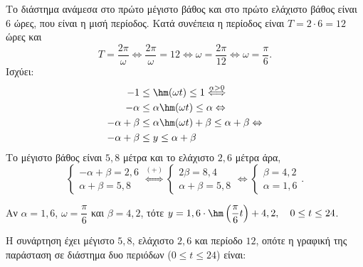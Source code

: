 \begin{alist}
\item Το διάστημα ανάμεσα στο πρώτο μέγιστο βάθος και στο πρώτο ελάχιστο βάθος είναι $6$ ώρες, που είναι η μισή περίοδος. Κατά συνέπεια η περίοδος είναι $T = 2 \cdot 6 = 12$ ώρες και
\[T = \frac{2\pi}{\omega} \Leftrightarrow \frac{2\pi}{\omega} = 12 \Leftrightarrow \omega = \frac{2\pi}{12} \Leftrightarrow \omega = \frac{\pi}{6}.\]
Ισχύει:
\begin{align*}
-1 &\le \hm (\omega t) \le 1 \overset{\alpha > 0}{\Longleftrightarrow} \\
-\alpha &\le \alpha\hm (\omega t) \le \alpha \Leftrightarrow \\
-\alpha + \beta &\le \alpha\hm (\omega t) + \beta \le \alpha + \beta \Leftrightarrow \\
-\alpha + \beta &\le y \le \alpha + \beta
\end{align*}
Το μέγιστο βάθος είναι $5,8$ μέτρα και το ελάχιστο $2,6$ μέτρα άρα,
\[\begin{cases} -\alpha + \beta = 2,6 \\ \alpha + \beta = 5,8 \end{cases} \overset{(+)}{\Longleftrightarrow} \begin{cases} 2\beta = 8,4 \\ \alpha + \beta = 5,8 \end{cases} \Leftrightarrow \begin{cases} \beta = 4,2 \\ \alpha = 1,6 \end{cases}.\]
\item Αν $\alpha = 1,6$, $\omega = \dfrac{\pi}{6}$ και $\beta = 4,2$, τότε $y = 1,6 \cdot \hm \left(\dfrac{\pi}{6}t\right) + 4,2, \quad 0 \le t \le 24$.
\begin{rlist}
\item Η συνάρτηση έχει μέγιστο $5,8$, ελάχιστο $2,6$ και περίοδο $12$, οπότε η γραφική της παράσταση σε διάστημα δυο περιόδων ($0 \le t \le 24$) είναι:
\begin{center}
\end{center}
\end{rlist}
\end{alist}
